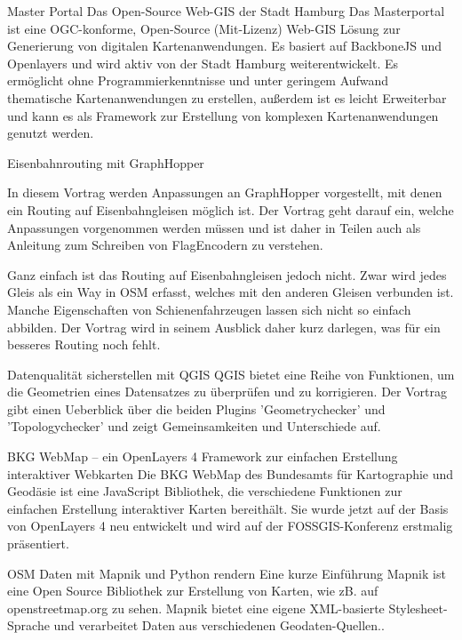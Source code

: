 %
{Master Portal}%
{Das Open-Source Web-GIS der Stadt Hamburg}%
{%
Das Masterportal ist eine OGC-konforme, Open-Source (Mit-Lizenz) Web-GIS Lösung zur Generierung von digitalen Kartenanwendungen. Es basiert auf BackboneJS und Openlayers und wird aktiv von der Stadt Hamburg weiterentwickelt.
Es ermöglicht ohne Programmierkenntnisse und unter geringem Aufwand thematische Kartenanwendungen zu erstellen, außerdem ist es leicht Erweiterbar und kann es als Framework zur Erstellung von komplexen Kartenanwendungen genutzt werden.%
}

%
{Eisenbahnrouting mit GraphHopper}%
{}%
{%
In diesem Vortrag werden Anpassungen an GraphHopper vorgestellt, mit denen ein Routing auf Eisenbahngleisen möglich ist. Der Vortrag geht darauf ein, welche Anpassungen vorgenommen werden müssen und ist daher in Teilen auch als Anleitung zum Schreiben von FlagEncodern zu verstehen.

Ganz einfach ist das Routing auf Eisenbahngleisen jedoch nicht. Zwar wird jedes Gleis als ein Way in OSM erfasst, welches mit den anderen Gleisen verbunden ist. Manche Eigenschaften von Schienenfahrzeugen lassen sich nicht so einfach abbilden. Der Vortrag wird in seinem Ausblick daher kurz darlegen, was für ein besseres Routing noch fehlt.%
}


%
{Datenqualität sicherstellen mit QGIS}%
{}%
{%
QGIS bietet eine Reihe von Funktionen, um die Geometrien eines Datensatzes zu überprüfen und zu korrigieren. Der Vortrag gibt einen Ueberblick über die beiden Plugins 'Geometrychecker' und 'Topologychecker' und zeigt Gemeinsamkeiten und Unterschiede auf.%
}

%
{BKG WebMap – ein OpenLayers 4 Framework zur einfachen Erstellung interaktiver Webkarten}%
{}%
{%
Die BKG WebMap des Bundesamts für Kartographie und Geodäsie ist eine JavaScript Bibliothek, die verschiedene Funktionen zur einfachen Erstellung interaktiver Karten bereithält. Sie wurde jetzt auf der Basis von OpenLayers 4 neu entwickelt und wird auf der FOSSGIS-Konferenz erstmalig präsentiert.%
}

%
{OSM Daten mit Mapnik und Python rendern}%
{Eine kurze Einführung }%
{%
Mapnik ist eine Open Source Bibliothek zur Erstellung von Karten, wie zB. auf openstreetmap.org zu sehen. Mapnik bietet eine eigene XML-basierte Stylesheet-Sprache und verarbeitet Daten aus verschiedenen Geodaten-Quellen..%
}

